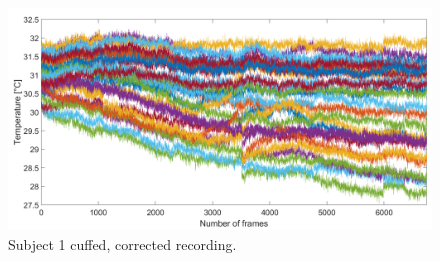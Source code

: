 \begin{figure}[htbp]
\begin{minipage}[b]{0.45\linewidth}
	\end{minipage}
	\hspace{0.2cm}
	\begin{minipage}[b]{0.45\linewidth}
		\centering
		\includegraphics[width=\linewidth]{figures/Recordings/Sub2_cuffed_corr}
		\caption{Subject 1 cuffed, corrected recording.}
		
	\end{minipage}
\end{figure}


